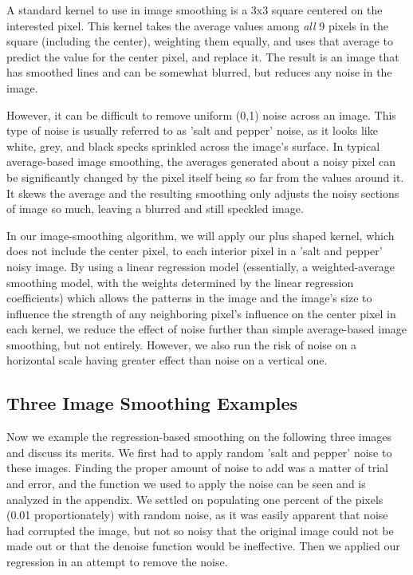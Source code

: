 \documentclass{article}
\begin{document}
A standard kernel to use in image smoothing is a 3x3 square centered on the interested pixel.  This kernel takes the average values among \textit{all} 9 pixels in the square (including the center), weighting them equally, and uses that average to predict the value for the center pixel, and replace it.  The result is an image that has smoothed lines and can be somewhat blurred, but reduces any noise in the image.  

However, it can be difficult to remove uniform (0,1) noise across an image.  This type of noise is usually referred to as 'salt and pepper' noise, as it looks like white, grey, and black specks sprinkled across the image's surface.  In typical average-based image smoothing, the averages generated about a noisy pixel can be significantly changed by the pixel itself being so far from the values around it.  It skews the average and the resulting smoothing only adjusts the noisy sections of image so much, leaving a blurred and still speckled image.

In our image-smoothing algorithm, we will apply our plus shaped kernel, which does not include the center pixel, to each interior pixel in a 'salt and pepper' noisy image.  By using a linear regression model (essentially, a weighted-average smoothing model, with the weights determined by the linear regression coefficients) which allows the patterns in the image and the image's size to influence the strength of any neighboring pixel's influence on the center pixel in each kernel, we reduce the effect of noise further than simple average-based image smoothing, but not entirely.  However, we also run the risk of noise on a horizontal scale having greater effect than noise on a vertical one.

\subsection{Three Image Smoothing Examples}

Now we example the regression-based smoothing on the following three images and discuss its merits.  We first had to apply random 'salt and pepper' noise to these images.  Finding the proper amount of noise to add was a matter of trial and error, and the function we used to apply the noise can be seen and is analyzed in the appendix.  We settled on  populating one percent of the pixels (0.01 proportionately) with random noise, as it was easily apparent that noise had corrupted the image, but not so noisy that the original image could not be made out or that the denoise function would be ineffective. Then we applied our regression in an attempt to remove the noise.
\end{document}
